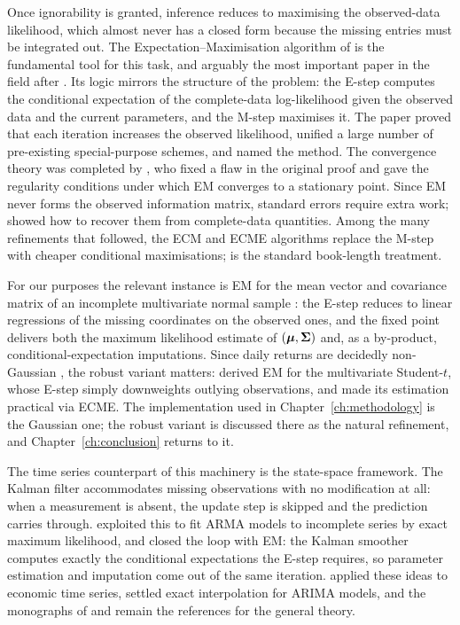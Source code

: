 Once ignorability is granted, inference reduces to maximising the
observed-data likelihood, which almost never has a closed form because
the missing entries must be integrated out. The
Expectation--Maximisation algorithm of \citet{dempster1977} is the
fundamental tool for this task, and arguably the most important paper
in the field after \citet{rubin1976}. Its logic mirrors the structure
of the problem: the E-step computes the conditional expectation of the
complete-data log-likelihood given the observed data and the current
parameters, and the M-step maximises it. The paper proved that each
iteration increases the observed likelihood, unified a large number of
pre-existing special-purpose schemes, and named the method. The
convergence theory was completed by \citet{wu1983}, who fixed a flaw
in the original proof and gave the regularity conditions under which
EM converges to a stationary point. Since EM never forms the observed
information matrix, standard errors require extra work;
\citet{louis1982} showed how to recover them from complete-data
quantities. Among the many refinements that followed, the ECM and
ECME algorithms \citep{meng1993, liu1994} replace the M-step with
cheaper conditional maximisations; \citet{mclachlan2008} is the
standard book-length treatment.

For our purposes the relevant instance is EM for the mean vector and
covariance matrix of an incomplete multivariate normal sample
\citep[Ch.~11]{little2019}: the E-step reduces to linear regressions
of the missing coordinates on the observed ones, and the fixed point
delivers both the maximum likelihood estimate of $(\boldsymbol{\mu}, \boldsymbol{\Sigma})$
and, as a by-product, conditional-expectation imputations. Since
daily returns are decidedly non-Gaussian \citep{cont2001}, the robust
variant matters: \citet{little1988} derived EM for the multivariate
Student-$t$, whose E-step simply downweights outlying observations,
and \citet{liu1995} made its estimation practical via ECME. The
implementation used in Chapter~\ref{ch:methodology} is the Gaussian one;
the robust variant is discussed there as the natural refinement, and
Chapter~\ref{ch:conclusion} returns to it.

The time series counterpart of this machinery is the state-space
framework. The Kalman filter \citep{kalman1960} accommodates missing
observations with no modification at all: when a measurement is
absent, the update step is skipped and the prediction carries through.
\citet{jones1980} exploited this to fit ARMA models to incomplete
series by exact maximum likelihood, and \citet{shumway1982} closed the
loop with EM: the Kalman smoother computes exactly the conditional
expectations the E-step requires, so parameter estimation and
imputation come out of the same iteration. \citet{harvey1984} applied
these ideas to economic time series, \citet{kohn1986} settled exact
interpolation for ARIMA models, and the monographs of
\citet{harvey1989} and \citet{durbin2012} remain the references for
the general theory.

